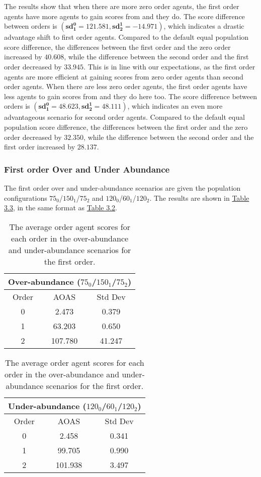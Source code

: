 The results show that when there are more zero order agents, the first order agents have more agents to gain scores from and they do. The score difference between orders is $(\mathbf{sd^0_1 = 121.581}, \mathbf{sd^1_2 = -14.971})$, which indicates a drastic advantage shift to first order agents. Compared to the default equal population score difference, the differences between the first order and the zero order increased by $\mathbf{40.608}$, while the difference between the second order and the first order decreased by $\mathbf{33.945}$. This is in line with our expectations, as the first order agents are more efficient at gaining scores from zero order agents than second order agents. When there are less zero order agents, the first order agents have less agents to gain scores from and they do here too. The score difference between orders is $(\mathbf{sd^0_1 = 48.623}, \mathbf{sd^1_2 = 48.111})$, which indicates an even more advantageous scenario for second order agents. Compared to the default equal population score difference, the differences between the first order and the zero order decreased by $\mathbf{32.350}$, while the difference between the second order and the first order increased by $\mathbf{28.137}$. 

\subsubsection{First order Over and Under Abundance}

The first order over and under-abundance scenarios are given the population configurations $75_{0}$/$150_{1}$/$75_{2}$ and $120_{0}$/$60_{1}$/$120_{2}$. The results are shown in \hyperref[table:non-sig-first-order-simple]{Table 3.3}, in the same format as \hyperref[table:non-sig-zero-order-simple]{Table 3.2}.

\begin{table}[h]
\centering
\begin{tabular}{|c|c|c|}
\hline
\multicolumn{3}{|c|}{Over-abundance ($75_{0}$/$150_{1}$/$75_{2}$)} \\
\hline
Order & AOAS & Std Dev \\
\hline
0     & 2.473    & 0.379    \\
1     & 63.203   & 0.650    \\
2     & 107.780  & 41.247   \\
\hline
\end{tabular}
\qquad
\begin{tabular}{|c|c|c|}
\hline
\multicolumn{3}{|c|}{Under-abundance ($120_{0}$/$60_{1}$/$120_{2}$)} \\
\hline
Order & AOAS & Std Dev \\
\hline
0     & 2.458   & 0.341  \\
1     & 99.705  & 0.990  \\
2     & 101.938 & 3.497  \\
\hline
\end{tabular}
\caption{The average order agent scores for each order in the over-abundance and under-abundance scenarios for the first order.}
\label{table:non-sig-first-order-simple}
\end{table}


